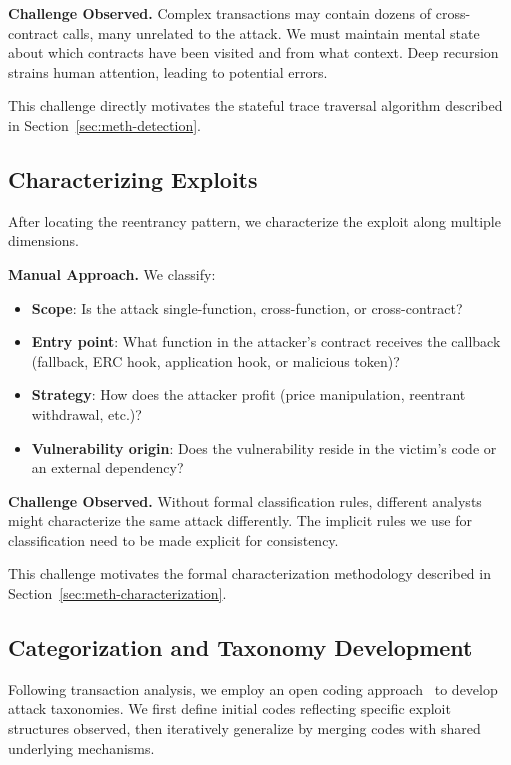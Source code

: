 \textbf{Challenge Observed.} Complex transactions may contain dozens of cross-contract calls, many unrelated to the attack. We must maintain mental state about which contracts have been visited and from what context. Deep recursion strains human attention, leading to potential errors.

This challenge directly motivates the stateful trace traversal algorithm described in Section~\ref{sec:meth-detection}.

\subsection{Characterizing Exploits}
\label{sec:meth-characterizing}

After locating the reentrancy pattern, we characterize the exploit along multiple dimensions.

\textbf{Manual Approach.} We classify:
\begin{itemize}
    \item \textbf{Scope}: Is the attack single-function, cross-function, or cross-contract?
    \item \textbf{Entry point}: What function in the attacker's contract receives the callback (fallback, ERC hook, application hook, or malicious token)?
    \item \textbf{Strategy}: How does the attacker profit (price manipulation, reentrant withdrawal, etc.)?
    \item \textbf{Vulnerability origin}: Does the vulnerability reside in the victim's code or an external dependency?
\end{itemize}

\textbf{Challenge Observed.} Without formal classification rules, different analysts might characterize the same attack differently. The implicit rules we use for classification need to be made explicit for consistency.

This challenge motivates the formal characterization methodology described in Section~\ref{sec:meth-characterization}.

\subsection{Categorization and Taxonomy Development}

Following transaction analysis, we employ an open coding approach~\cite{open-coding:strauss-corbin, open-coding:saldana} to develop attack taxonomies. We first define initial codes reflecting specific exploit structures observed, then iteratively generalize by merging codes with shared underlying mechanisms.

